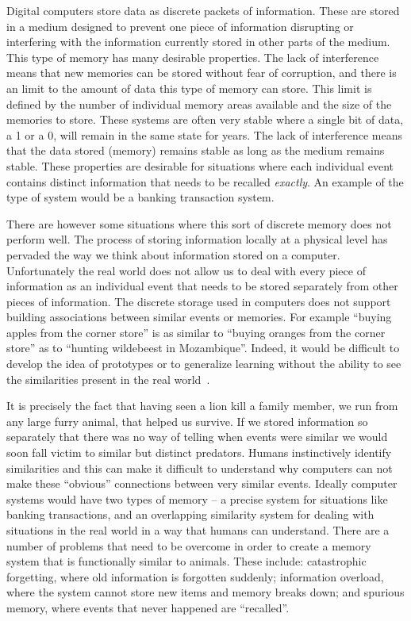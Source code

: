 Digital computers store data as discrete packets of information.  These are stored in a medium designed to prevent one piece of information disrupting or interfering with the information currently stored in other parts of the medium. This type of memory has many desirable properties.  The lack of interference means that new memories can be stored without fear of corruption, and there is an  limit to the amount of data this type of memory can store. This limit is defined by the number of individual memory areas available and the size of the memories to store.  These systems are often  very stable where a single bit of data, a 1 or a 0, will remain in the same state for years.  The lack of interference means that the data stored (memory) remains stable as long as the medium remains stable.  These properties are desirable for situations where each individual event contains distinct information that needs to be recalled {\em exactly}.  An example of the type of system would be a banking transaction system.

\nocite{Pfeiffer1965} %

There are however some situations where this sort of discrete memory does not perform well.   The process of storing information locally at a physical level has pervaded the way we think about information stored on a computer.  Unfortunately the real world does not allow us to deal with every piece of information as an individual event that needs to be stored separately from other pieces of information. The discrete storage used in computers does not support building associations between similar events or memories.  For example ``buying apples from the corner store'' is as similar to ``buying oranges from the corner store'' as to ``hunting wildebeest in Mozambique''. Indeed, it would be difficult to develop the idea of prototypes or to generalize learning without the ability to see the similarities present in the real world~\citep{Medin1984}.

It is precisely the fact that having seen a lion kill a family member, we run from any large furry animal, that helped us survive.  If we stored information so separately that there was no way of telling when events were similar we would soon fall victim to similar but distinct predators.  Humans instinctively identify similarities and this can make it difficult to understand why computers can not make these ``obvious'' connections between very similar events.  Ideally computer systems would have two types of memory -- a precise system for situations like banking transactions, and an overlapping similarity system for dealing with situations in the real world in a way that humans can understand.  There are a number of problems that need to be overcome in order to create a memory system that is functionally similar to animals.  These include: catastrophic forgetting, where old information is forgotten suddenly; information overload, where the system cannot store new items and memory breaks down; and spurious memory, where events that never happened are ``recalled''.
  
